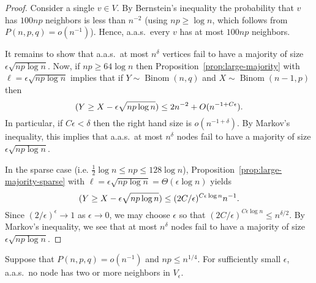 \documentclass[EJP,final]{ejpecp}
\newcommand{\1}[1]{\mathbbm{1}_{\{#1\}}}
\let\Pr\relax
\DeclareMathOperator{\Pr}{Pr}
\DeclareMathOperator{\Binom}{Binom}
\begin{document}
\begin{proof}
 Consider a single $v \in V$. By Bernstein's inequality
 the probability that $v$ has $100np$ neighbors is less than $n^{-2}$
 (using $np \ge \log n$, which follows from $P(n, p, q) = o(n^{-1})$).
 Hence, a.a.s.\ every $v$ has at most $100np$ neighbors.

 It remains to show that a.a.s.\ at most $n^\delta$ vertices
 fail to have a majority of size $\epsilon \sqrt{np \log n}$.
 Now, if $np \ge 64 \log n$ then Proposition~\ref{prop:large-majority}
 with $\ell = \epsilon \sqrt{np \log n}$ implies that
 if $Y \sim \Binom(n, q)$ and $X \sim \Binom(n-1, p)$ then
 \[
  \Pr(Y \ge X - \epsilon \sqrt{np \log n}) \le 2n^{-2} + O(n^{-1 + C \epsilon}).
 \]
 In particular, if $C\epsilon < \delta$ then the right hand size is
 $o(n^{-1 + \delta})$. By Markov's inequality, this implies that a.a.s.\ at most
 $n^{\delta}$ nodes fail to have a majority of size
 $\epsilon \sqrt{np \log n}$.

 In the sparse case (i.e. $\frac 12 \log n \le np \le 128 \log n$),
 Proposition~\ref{prop:large-majority-sparse} with
 $\ell = \epsilon \sqrt{np \log n} = \Theta(\epsilon \log n)$ yields
 \[
  \Pr(Y \ge X - \epsilon \sqrt{np \log n})
  \le (2C/\epsilon)^{C \epsilon \log n} n^{-1}.
 \]
 Since $(2/\epsilon)^{\epsilon} \to 1$ as $\epsilon \to 0$, we may choose
 $\epsilon$ so that $(2C/\epsilon)^{C \epsilon \log n} \le n^{\delta/2}$.
 By Markov's inequality, we see that at most $n^\delta$ nodes
 fail to have a majority of size $\epsilon \sqrt{np \log n}$.
\end{proof}


\begin{proposition}\label{prop:Ve-neighbors}
  Suppose that $P(n, p, q) = o(n^{-1})$ and $np \le n^{1/4}$.
  For sufficiently small $\epsilon$, a.a.s.\ no node has two or more neighbors in $V_\epsilon$.
\end{proposition}
\end{document}
